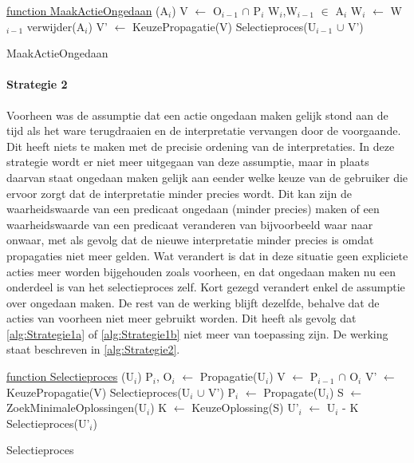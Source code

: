 \begin{algorithm}
	\underline{function MaakActieOngedaan} (A$_{i}$)\;
	V $\leftarrow$ O$_{i-1}$ $\cap$ P$_{i}$\;
	{W$_{i}$,W$_{i-1}$} $\in$ A$_{i}$\;
	W$_{i}$ $\leftarrow$ W$_{i-1}$\;	
	verwijder(A$_{i}$)\;
		{
		V' $\leftarrow$ KeuzePropagatie(V)\;
			{
			Selectieproces(U$_{i-1}$ $\cup$ V')\;
			}
		}
	\caption{MaakActieOngedaan\label{alg:Strategie1b}}
\end{algorithm}

\paragraph{Strategie 2}
Voorheen was de assumptie dat een actie ongedaan maken gelijk stond aan de tijd als het ware terugdraaien en de interpretatie vervangen door de voorgaande. Dit heeft niets te maken met de precisie ordening van de interpretaties. In deze strategie wordt er niet meer uitgegaan van deze assumptie, maar in plaats daarvan staat ongedaan maken gelijk aan eender welke keuze van de gebruiker die ervoor zorgt dat de interpretatie minder precies wordt. Dit kan zijn de waarheidswaarde van een predicaat ongedaan (minder precies) maken of een waarheidswaarde van een predicaat veranderen van bijvoorbeeld waar naar onwaar, met als gevolg dat de nieuwe interpretatie minder precies is omdat propagaties niet meer gelden. Wat verandert is dat in deze situatie geen expliciete acties meer worden bijgehouden zoals voorheen, en dat ongedaan maken nu een onderdeel is van het selectieproces zelf. Kort gezegd verandert enkel de assumptie over ongedaan maken. De rest van de werking blijft dezelfde, behalve dat de acties van voorheen niet meer gebruikt worden. Dit heeft als gevolg dat \ref{alg:Strategie1a} of \ref{alg:Strategie1b} niet meer van toepassing zijn. De werking staat beschreven in \ref{alg:Strategie2}. 

\begin{algorithm}
	\underline{function Selectieproces} (U$_{i}$)\;
	\Output{}
		{
		P$_{i}$, O$_{i}$ $\leftarrow$ Propagatie(U$_{i}$)\;
		V $\leftarrow$ P$_{i-1}$ $\cap$ O$_{i}$\;
			{
			V' $\leftarrow$ KeuzePropagatie(V)\; 
			Selectieproces(U$_{i}$ $\cup$ V')\;
			}
			{
			P$_{i}$ $\leftarrow$ Propagate(U$_{i}$)\;	
			}
		}
		{
		S $\leftarrow$ ZoekMinimaleOplossingen(U$_{i}$)\; 
		K $\leftarrow$ KeuzeOplossing(S)\; 
		U'$_{i}$ $\leftarrow$ U$_{i}$ - K\; 
		Selectieproces(U'$_{i}$)\;
		}
	\caption{Selectieproces\label{alg:Strategie2}}
\end{algorithm}

